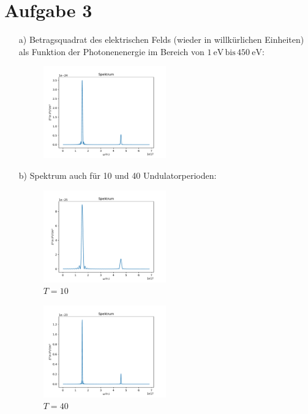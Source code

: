 \documentclass[11pt,a4paper]{article}
\begin{document}
    \section*{Aufgabe 3}
		\begin{itemize}
			\item[a)] Betragsquadrat des elektrischen Felds (wieder in willkürlichen Einheiten) als Funktion der Photonenenergie 
			im Bereich von $\SI{1}{\electronvolt} \, \text{bis} \, \SI{450}{\electronvolt}$:
			\begin{figure}[H]
				\centering
				\includegraphics[width=0.5\textwidth]{build/spektrum_K1.5_Perioden20.pdf}
			\end{figure}

			\item[b)] Spektrum auch für 10 und 40 Undulatorperioden:

			\begin{figure}[H]
				\centering
				\includegraphics[width=0.5\textwidth]{build/spektrum_K1.5_Perioden10.pdf}
				\caption{$T = 10$}
			\end{figure}

			\begin{figure}[H]
				\centering
				\includegraphics[width=0.5\textwidth]{build/spektrum_K1.5_Perioden40.pdf}
				\caption{$T = 40$}
			\end{figure}


\end{itemize}
\end{document}
